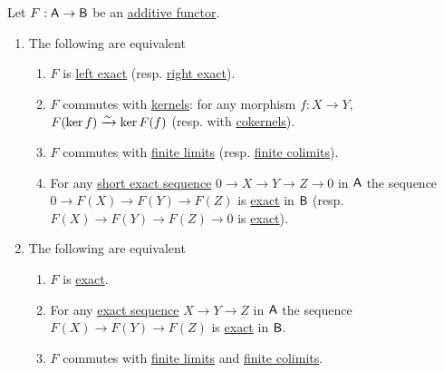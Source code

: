 \documentclass[../../../main]{subfiles}
\begin{document}
\begin{lemma}\label{lemma:schapira-exact-functor}
  Let \(F: \mathsf{A} \to \mathsf{B}\) be an \hyperref[def:additive-functor]{additive functor}.
  \begin{enumerate}
    \item The following are equivalent
          \begin{enumerate}
            \item \(F\) is \hyperref[def:exact-complex-functor]{left exact} (resp. \hyperref[def:exact-complex-functor]{right exact}).
            \item \(F\) commutes with \hyperref[def:categorical-kernel]{kernels}: for any morphism \(f: X \to Y\), \(F(\ker f) \xrightarrow{\sim} \ker F(f)\) (resp. with \hyperref[def:categorical-cokernel]{cokernels}).
            \item \(F\) commutes with \hyperref[def:categorical-limit]{finite limits} (resp. \hyperref[def:categorical-colimit]{finite colimits}).
            \item For any \hyperref[def:short-exact-sequence]{short exact sequence} \(0 \to X \to Y \to Z \to 0\) in \(\mathsf{A}\) the sequence \(0 \to F(X) \to F(Y) \to F(Z)\) is \hyperref[def:short-exact-sequence]{exact} in \(\mathsf{B}\) (resp. \(F(X) \to F(Y) \to F(Z) \to 0\) is \hyperref[def:short-exact-sequence]{exact}).
          \end{enumerate}

    \item  The following are equivalent
          \begin{enumerate}
            \item \(F\) is \hyperref[def:exact-complex-functor]{exact}.
            \item For any \hyperref[def:exact-complex]{exact sequence} \(X \to Y \to Z\) in \(\mathsf{A}\) the sequence \(F(X) \to F(Y) \to F(Z)\) is \hyperref[def:exact-complex]{exact} in \(\mathsf{B}\).
            \item \(F\) commutes with \hyperref[def:categorical-colimit]{finite limits} and \hyperref[def:categorical-colimit]{finite colimits}.
          \end{enumerate}
  \end{enumerate}
\end{lemma}
\end{document}
